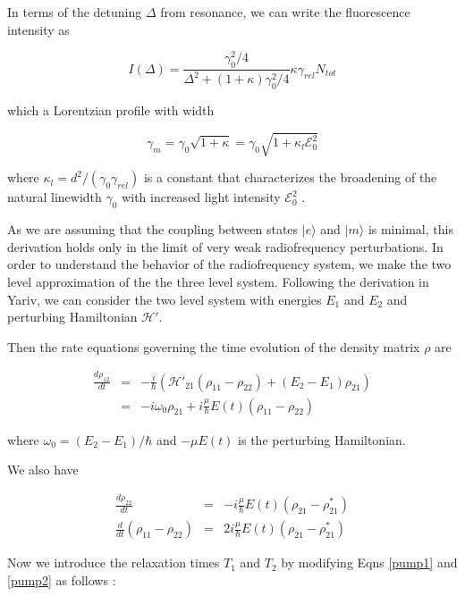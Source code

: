 In terms of the detuning $\Delta$ from resonance, we can write the fluorescence intensity as

\begin{equation}
I(\Delta) = \frac{\gamma_0^2/4}{\Delta^2 +(1+\kappa)\gamma_0^2/4}\kappa\gamma_{rel}N_{tot}
\end{equation}

which a Lorentzian profile with width

\begin{equation}
\gamma_m = \gamma_0\sqrt{1+\kappa} = \gamma_0\sqrt{1+\kappa_l\mathcal{E}_0^2}
\label{kappal}
\end{equation}

where $\kappa_l = d^2/(\gamma_0\gamma_{rel})$ is a constant that
characterizes the broadening of the natural linewidth $\gamma_0$ with
increased light intensity $\mathcal{E}_0^2$ \cite{budker}.


As we are assuming that the coupling between states $|e\rangle$ and
$|m\rangle$ is minimal, this derivation holds only in the limit of
very weak radiofrequency perturbations. In order to understand the
behavior of the radiofrequency system, we make the two level
approximation of the the three level system. Following the derivation
in Yariv, we can consider the two level system with energies $E_1$ and
$E_2$ and perturbing Hamiltonian $\mathcal{H}'$.

Then the rate equations governing the time evolution of the density
matrix $\rho$ are

\begin{eqnarray}
\frac{d\rho_{12}}{dt} &=& -\frac{i}{\hbar}(\mathcal{H}'_{21}(\rho_{11} - \rho_{22}) + (E_2 - E_1)\rho_{21}) \\
 &=& -i\omega_0\rho_{21} + i\frac{\mu}{\hbar}E(t)(\rho_{11} - \rho_{22})
\label{pump1}
\end{eqnarray}

where $\omega_0 = (E_2 - E_1)/\hbar$ and $-\mu E(t)$ is the perturbing
Hamiltonian.

We also have

\begin{eqnarray}
\frac{d\rho_{22}}{dt} &=& -i\frac{\mu}{\hbar}E(t)(\rho_{21} - \rho_{21}^*)\\
\frac{d}{dt}(\rho_{11} - \rho_{22}) &=& 2i\frac{\mu}{\hbar}E(t)(\rho_{21} - \rho_{21}^*)
\label{pump2}
\end{eqnarray}

Now we introduce the relaxation times $T_1$ and $T_2$ by modifying Eqns \ref{pump1} and \ref{pump2} as follows \cite{yariv}:

